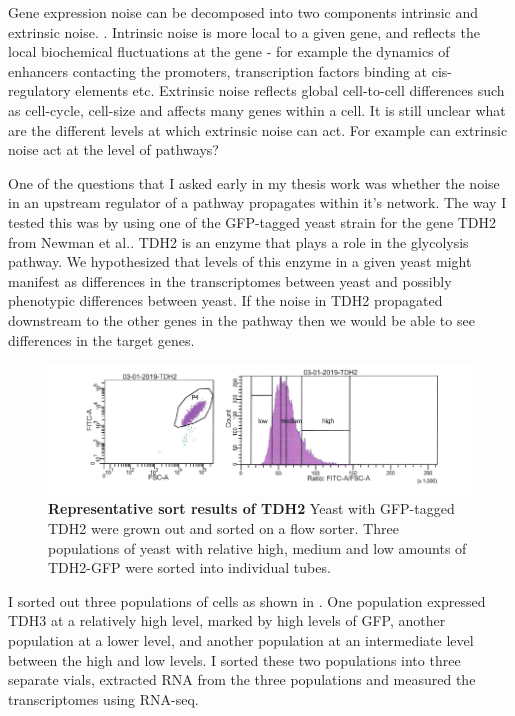 Gene expression noise can be decomposed into two components intrinsic and extrinsic noise. \cite{elowitz} \cite{oshea}. Intrinsic noise is more local to a given gene, and reflects the local biochemical fluctuations at the gene - for example the dynamics of enhancers contacting the promoters, transcription factors binding at cis-regulatory elements etc. Extrinsic noise reflects global cell-to-cell differences such as cell-cycle, cell-size and affects many genes within a cell. It is still unclear what are the different levels at which extrinsic noise can act. For example can extrinsic noise act at the level of pathways?

One of the questions that I asked early in my thesis work was whether the noise in an upstream regulator of a pathway propagates within it's network. The way I tested this was by using one of the GFP-tagged yeast strain for the gene TDH2 from Newman et al.\cite{Newman}. TDH2 is an enzyme that plays a role in the glycolysis pathway. We hypothesized that levels of this enzyme in a given yeast might manifest as differences in the transcriptomes between yeast and possibly phenotypic differences between yeast. If the noise in TDH2 propagated downstream to the other genes in the pathway then we would be able to see differences in the target genes. 

\begin{figure}[t!]  
    \centering
    \includegraphics[width=\linewidth]{figures/intro/intro_tdh2_facs.png}
    \caption[Representative sort results of TDH2]{%
        \textbf{Representative sort results of TDH2}
        Yeast with GFP-tagged TDH2 were grown out and sorted on a flow sorter. Three populations of yeast with relative high, medium and low amounts of TDH2-GFP were sorted into individual tubes.
    }
    \label{fig:intro3}
\end{figure}

I sorted out three populations of cells as shown in . One population expressed TDH3 at a relatively high level, marked by high levels of GFP, another population at a lower level, and another population at an intermediate level between the high and low levels.  I sorted these two populations into three separate vials, extracted RNA from the three populations and measured the transcriptomes using RNA-seq.

